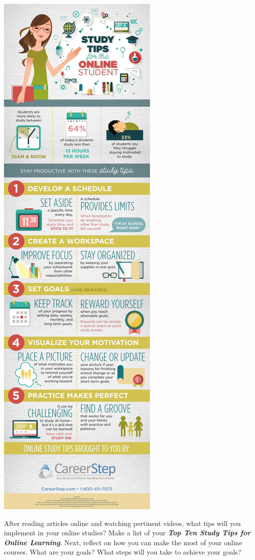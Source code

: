 \documentclass[
]{book}
\theoremstyle{definition}
\theoremstyle{definition}
\theoremstyle{definition}
\theoremstyle{definition}
\theoremstyle{remark}
\begin{document}
\begin{reflect}
\includegraphics{assets/u1/5-Great-Study-Tips-For-Online-Students-Infographic.jpg}

After reading articles online and watching pertinent videos, what tips will you implement in your online studies?
Make a list of your \textbf{\emph{Top Ten Study Tips for Online Learning}}. Next, reflect on how you can make the most of your online courses. What are your goals? What steps will you take to achieve your goals?
\end{reflect}
\end{document}
